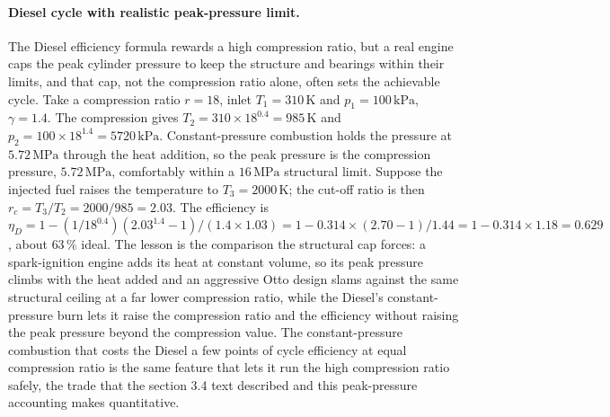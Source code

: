 \paragraph{Diesel cycle with realistic peak-pressure limit.} The Diesel
efficiency formula rewards a high compression ratio, but a real engine caps the
peak cylinder pressure to keep the structure and bearings within their limits,
and that cap, not the compression ratio alone, often sets the achievable cycle.
Take a compression ratio $r = 18$, inlet $T_1 = 310\,\si{\kelvin}$ and $p_1 =
100\,\text{kPa}$, $\gamma = 1.4$. The compression gives $T_2 = 310 \times
18^{0.4} = 985\,\si{\kelvin}$ and $p_2 = 100 \times 18^{1.4} = 5720\,\text{kPa}$.
Constant-pressure combustion holds the pressure at $5.72\,\text{MPa}$ through the
heat addition, so the peak pressure is the compression pressure, $5.72\,\text{MPa}$,
comfortably within a $16\,\text{MPa}$ structural limit. Suppose the injected fuel
raises the temperature to $T_3 = 2000\,\si{\kelvin}$; the cut-off ratio is then
$r_c = T_3/T_2 = 2000/985 = 2.03$. The efficiency is $\eta_D = 1 - (1/18^{0.4})
(2.03^{1.4} - 1)/(1.4 \times 1.03) = 1 - 0.314 \times (2.70 - 1)/1.44 = 1 -
0.314 \times 1.18 = 0.629$, about $63\,\%$ ideal. The lesson is the comparison
the structural cap forces: a spark-ignition engine adds its heat at constant
volume, so its peak pressure climbs with the heat added and an aggressive Otto
design slams against the same structural ceiling at a far lower compression
ratio, while the Diesel's constant-pressure burn lets it raise the compression
ratio and the efficiency without raising the peak pressure beyond the
compression value. The constant-pressure combustion that costs the Diesel a few
points of cycle efficiency at equal compression ratio is the same feature that
lets it run the high compression ratio safely, the trade that the section 3.4
text described and this peak-pressure accounting makes quantitative.

